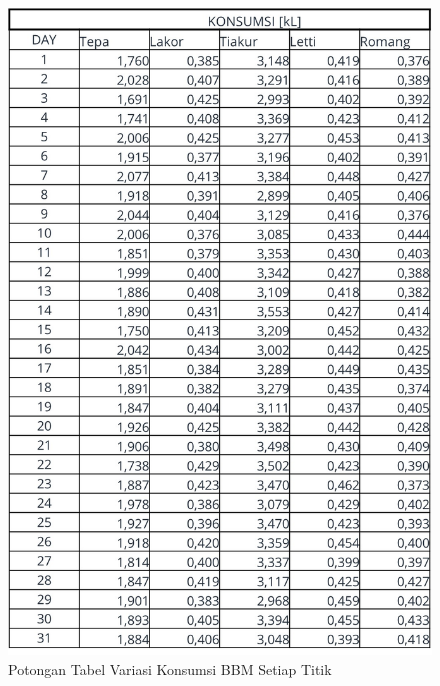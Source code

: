 \begin{figure}[!ht]
    \centering
    \includegraphics[width=\linewidth,height=\textheight,keepaspectratio]{lampiran/tabel-konsumsi-simu.jpg}
    \caption*{Potongan Tabel Variasi Konsumsi BBM Setiap Titik}
\end{figure}

